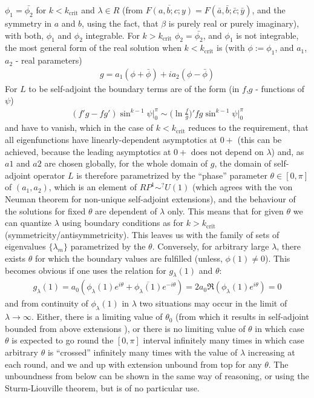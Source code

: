 $\phi_1=\bar{\phi_2}$ for $k<k_\text{crit}$ and $\lambda\in R$ (from
$\overline{F(a,b;c;y)}=F(\bar{a},\bar{b};\bar{c};\bar{y})$, and the
symmetry in $a$ and $b$, using the fact, that $\beta$ is purely real
or purely imaginary), with both, $\phi_1$ and $\phi_2$ integrable. For
$k>k_\text{crit}$ $\phi_2=\bar{\phi_2}$, and $\phi_1$ is not
integrable, the most general form of the real solution when
$k<k_\text{crit}$ is (with $\phi:=\phi_1$, and $a_1$, $a_2$ - real
parameters)
\begin{gather}
  g=a_1(\phi+\bar\phi)+i a_2(\phi-\bar\phi)
\end{gather}
For $L$ to be self-adjoint the boundary terms are of the form
(in $f$,$g$ - functions of $\psi$)
\begin{gather}
  (f'g-fg')\sin^{k-1}\psi\big|^\pi_0\sim \bigg(\ln \frac{f}{g}\bigg)'fg\sin^{k-1}\psi\big|_0^\pi
\end{gather}
and have to vanish, which in the case of $k<k_\text{crit}$ reduces to
the requirement, that all eigenfunctions have linearly-dependent
asymptotics at $0+$ (this can be achieved, because the leading
asymptotics at $0+$ does not depend on $\lambda$) and, as $a1$ and
$a2$ are chosen globally, for the whole domain of $g$, the domain of
self-adjoint operator $L$ is therefore parametrized by the ``phase''
parameter $\theta\in[0,\pi]$ of $(a_1,a_2)$, which is an element of
$RP^1\sim^?U(1)$ (which agrees with the von Neuman theorem for
non-unique self-adjoint extensions), and the behaviour of the solutions
for fixed $\theta$ are dependent of $\lambda$ only. This means that
for given $\theta$ we can quantize $\lambda$ using boundary conditions
as for $k>k_\text{crit}$ (symmetricity/antisymmetricity). This leaves
us with the family of sets of eigenvalues $\{\lambda_m\}$ parametrized
by the $\theta$. Conversely, for arbitrary large $\lambda$, there
exists $\theta$ for which the boundary values are fulfilled (unless,
$\phi(1)\ne0$). This becomes obvious if one uses the relation for
$g_\lambda(1)$ and $\theta$:
\begin{gather}
  g_\lambda(1)=a_0(\phi_\lambda(1)
  e^{i\theta}+\overline{\phi_\lambda(1)} e^{-i\theta})=2a_0\Re
  (\phi_\lambda(1) e^{i\theta})=0
\end{gather}
and from continuity of $\phi_\lambda(1)$ in $\lambda$ two situations
may occur in the limit of $\lambda\rightarrow\infty$. Either, there is
a limiting value of $\theta_0$ (from which it results in self-adjoint
bounded from above extensions ), or there is no limiting value of
$\theta$ in which case $\theta$ is expected to go round the $[0,\pi]$
interval infinitely many times in which case arbitrary $\theta$ is
``crossed'' infinitely many times with the value of $\lambda$
increasing at each round, and we and up with extension unbound from
top for any $\theta$. The unboundness from below can be shown in the
same way of reasoning, or using the Sturm-Liouville theorem, but is of
no particular use.

